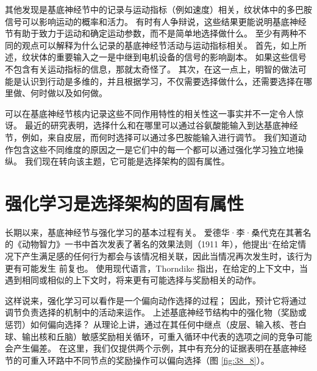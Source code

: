 其他发现是基底神经节中的记录与运动指标（例如速度）相关，纹状体中的多巴胺信号可以影响运动的概率和活力。 有时有人争辩说，这些结果更能说明基底神经节有助于致力于运动和确定运动参数，而不是简单地选择做什么。 至少有两种不同的观点可以解释为什么记录的基底神经节活动与运动指标相关。 首先，如上所述，纹状体的重要输入之一是中继到电机设备的信号的影响副本。 如果这些信号不包含有关运动指标的信息，那就太奇怪了。 其次，在这一点上，明智的做法可能是认识到行动是多维的，并且根据学习，不仅需要选择做什么，还需要选择在哪里做、何时做以及如何做。

可以在基底神经节核内记录这些不同作用特性的相关性这一事实并不一定令人惊讶。 最近的研究表明，选择什么和在哪里可以通过谷氨酸能输入到达基底神经节，例如，来自皮层，而何时选择可以通过多巴胺能输入进行调节。 我们知道动作包含这些不同维度的原因之一是它们中的每一个都可以通过强化学习独立地操纵。 我们现在转向该主题，它可能是选择架构的固有属性。


\section{强化学习是选择架构的固有属性}
长期以来，基底神经节与强化学习的基本过程有关。 爱德华·李·桑代克在其著名的《动物智力》一书中首次发表了著名的效果法则（1911 年），他提出“在给定情况下产生满足感的任何行为都会与该情况相关联，因此当情况再次发生时，该行为更有可能发生 前复也。 使用现代语言，Thorndike 指出，在给定的上下文中，当遇到相同或相似的上下文时，将来更有可能选择与奖励相关的动作。

这样说来，强化学习可以看作是一个偏向动作选择的过程； 因此，预计它将通过调节负责选择的机制中的活动来运作。 上述基底神经节结构中的强化物（奖励或惩罚）如何偏向选择？ 从理论上讲，通过在其任何中继点（皮层、输入核、苍白球、输出核和丘脑）敏感奖励相关循环，可重入循环中代表的选项之间的竞争可能会产生偏差。 
在这里，我们仅提供两个示例，其中有充分的证据表明在基底神经节的可重入环路中不同节点的奖励操作可以偏向选择（图 \ref{fig:38_8}）。

